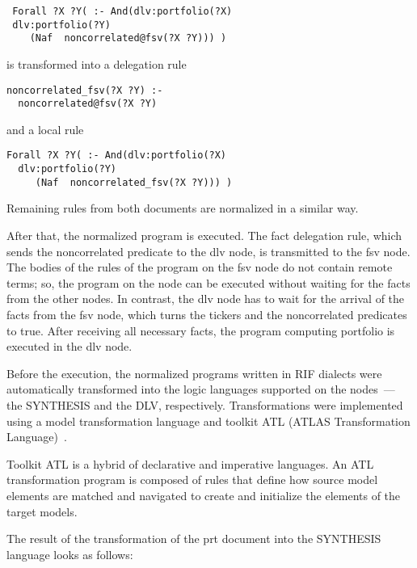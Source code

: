 \begin{multicols}{2}

\noindent
{\small
\begin{verbatim}
 Forall ?X ?Y( :- And(dlv:portfolio(?X)  
 dlv:portfolio(?Y)
    (Naf  noncorrelated@fsv(?X ?Y))) )
\end{verbatim}
}

\noindent
{\small is transformed into a delegation rule}
{\small
\begin{verbatim}
noncorrelated_fsv(?X ?Y) :- 
  noncorrelated@fsv(?X ?Y)
\end{verbatim}
and a local rule
\begin{verbatim}
Forall ?X ?Y( :- And(dlv:portfolio(?X)  
  dlv:portfolio(?Y)
     (Naf  noncorrelated_fsv(?X ?Y))) )
  \end{verbatim}
}
  


\vspace*{-9pt}

{\small
 Remaining rules from both documents are normalized in a similar way.

  After that, the normalized program is executed. The fact delegation rule, which
sends the {\sf noncorrelated} predicate to the {\sf dlv} node, is transmitted to the
{\sf fsv} node. The bodies of the rules of the program on the {\sf fsv} node do not contain
remote terms; so, the program on the node can be executed without waiting for the
facts from the other nodes. In contrast, the {\sf dlv} node has to wait for the arrival of the
facts from the {\sf fsv} node, which turns the {\sf tickers} and the {\sf noncorrelated}
predicates to {\sf true}. After receiving all necessary facts, the program computing
portfolio is executed in the {\sf dlv} node.

  Before the execution, the normalized programs written in RIF dialects were
automatically transformed into the logic languages supported on the nodes~--- the
SYNTHESIS and the DLV, respectively. Transformations were
implemented using a model transformation language and toolkit ATL (ATLAS
Transformation Language)~\cite{35-kal}.

  Toolkit ATL is a hybrid of declarative and imperative languages. An ATL transformation
program is composed of rules that define how source model elements are matched and
navigated to create and initialize the elements of the target models.

  The result of the transformation of the {\sf prt} document into the SYNTHESIS
language looks as follows: 
}


\end{multicols}
